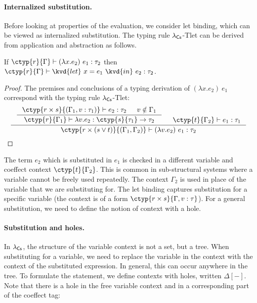 \newcommand{\ctimes}{ \hat{\times} }
\newcommand{\cdupl}[0]{ \Delta } %

\newcommand{\csprd}[0]{ \times }
\newcommand{\csvop}[0]{ \vee }
\newcommand{\cmerge}[0]{ \cpar }
\newcommand{\csplit}[0]{ \czip }

\newcommand{\clflt}{$\lambda_{\textnormal{\sffamily Cf}}$}
\newcommand{\clstr}{$\lambda_{\textnormal{\sffamily Cs}}$}
\newcommand{\rulest}[1]{\textsf{\clstr\small{-T#1}}}



\paragraph{Internalized substitution.}
Before looking at properties of the evaluation, we consider let binding, which can be 
viewed as internalized substitution. The typing rule \rulest{let} can be derived from 
application and abstraction as follows. 

\begin{lemma}
If $\ctyp{r}{\Gamma} \vdash (\lambda x.e_2)~e_1 : \tau_2$
then $\ctyp{r}{\Gamma} \vdash \kvd{let}~x=e_1~\kvd{in}~e_2 : \tau_2$.
\end{lemma}
\begin{proof}
The premises and conclusions of a typing derivation of $(\lambda x.e_2)~e_1$
correspond with the typing rule \rulest{let}:
\begin{equation*}
\inference[]
  {\inference
    {\ctyp{r \csprd s}{(\Gamma_1, v:\tau_1)} \vdash e_2 : \tau_2 & v \notin \Gamma_1}
    {\ctyp{r}{\Gamma_1} \vdash \lambda v.e_2 : \ctyp{s}{\tau_1} \rightarrow \tau_2 } &
   \ctyp{t}{\Gamma_2} \vdash e_1 : \tau_1 }
  {\ctyp{r \csprd (s \csvop t)}{(\Gamma_1, \Gamma_2)} \vdash (\lambda v.e_2)~e_1 : \tau_2}\qedhere
\end{equation*}
\end{proof}

The term $e_2$ which is substituted in $e_1$ is checked in a different variable
and coeffect context $\ctyp{t}{\Gamma_2}$. This is common in sub-structural systems where
a variable cannot be freely used repeatedly. The context $\Gamma_2$ is used in place of 
the variable that we are substituting for. The let binding captures substitution for a 
specific variable (the context is of a form $\ctyp{r \csprd s}{\Gamma, v:\tau}$).
For a general substitution, we need to define the notion of context with a hole.

\newcommand{\chole}[4]{\ctyp{#1}{#2}[#3|#4]}
\paragraph{Substitution and holes.}
In \clstr, the structure of the variable context is not a set, but a tree. When substituting
for a variable, we need to replace the variable in the context with the context of the
substituted expression. In general, this can occur anywhere in the tree. To formulate the
statement, we define contexts with holes, written $\Delta[-]$. Note that there is a hole
in the free variable context and in a corresponding part of the coeffect tag:

